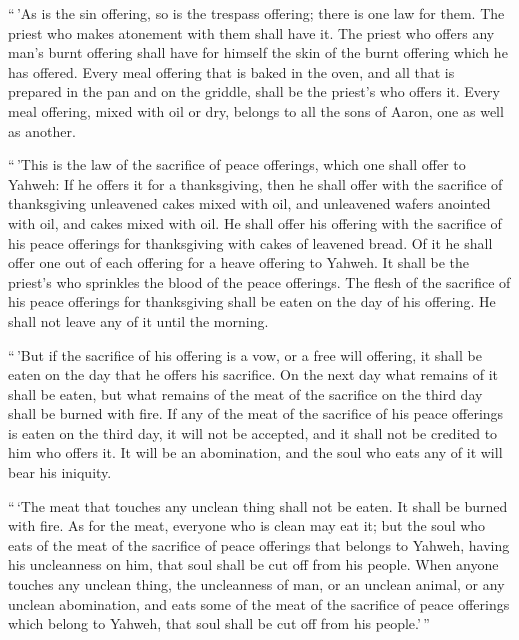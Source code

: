  ``\,'As is the sin offering, so is the trespass offering;
there is one law for them. The priest who makes atonement with them
shall have it.  The priest who offers any man's burnt
offering shall have for himself the skin of the burnt offering which he
has offered.  Every meal offering that is baked in the
oven, and all that is prepared in the pan and on the griddle, shall be
the priest's who offers it.  Every meal offering, mixed
with oil or dry, belongs to all the sons of Aaron, one as well as
another.

 ``\,'This is the law of the sacrifice of peace
offerings, which one shall offer to Yahweh:  If he offers
it for a thanksgiving, then he shall offer with the sacrifice of
thanksgiving unleavened cakes mixed with oil, and unleavened wafers
anointed with oil, and cakes mixed with oil.  He shall
offer his offering with the sacrifice of his peace offerings for
thanksgiving with cakes of leavened bread.  Of it he
shall offer one out of each offering for a heave offering to Yahweh. It
shall be the priest's who sprinkles the blood of the peace offerings.
 The flesh of the sacrifice of his peace offerings for
thanksgiving shall be eaten on the day of his offering. He shall not
leave any of it until the morning.

 ``\,'But if the sacrifice of his offering is a vow, or a
free will offering, it shall be eaten on the day that he offers his
sacrifice. On the next day what remains of it shall be eaten,
 but what remains of the meat of the sacrifice on the
third day shall be burned with fire.  If any of the meat
of the sacrifice of his peace offerings is eaten on the third day, it
will not be accepted, and it shall not be credited to him who offers it.
It will be an abomination, and the soul who eats any of it will bear his
iniquity.

 ``\,`The meat that touches any unclean thing shall not
be eaten. It shall be burned with fire. As for the meat, everyone who is
clean may eat it;  but the soul who eats of the meat of
the sacrifice of peace offerings that belongs to Yahweh, having his
uncleanness on him, that soul shall be cut off from his people.
 When anyone touches any unclean thing, the uncleanness
of man, or an unclean animal, or any unclean abomination, and eats some
of the meat of the sacrifice of peace offerings which belong to Yahweh,
that soul shall be cut off from his people.'\,''

